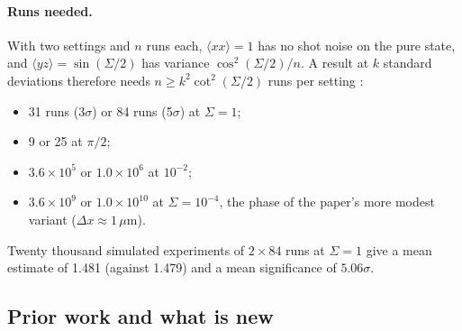 \paragraph{Runs needed.} With two settings and $n$ runs each, $\langle xx\rangle=1$ has no shot noise on the pure state, and
$\langle yz\rangle=\sin(\Sigma/2)$ has variance $\cos^2(\Sigma/2)/n$. A result at $k$ standard deviations therefore needs
$n\ge k^2\cot^2(\Sigma/2)$ runs per setting :
\begin{itemize}[nosep]
\item 31 runs (3$\sigma$) or 84 runs (5$\sigma$) at $\Sigma=1$;
\item 9 or 25 at $\pi/2$;
\item $3.6\times10^5$ or $1.0\times10^6$ at $10^{-2}$;
\item $3.6\times10^9$ or $1.0\times10^{10}$ at $\Sigma=10^{-4}$, the phase of the paper's more modest variant ($\Delta x\approx1\,\mu$m).
\end{itemize}
Twenty thousand simulated experiments of $2\times84$ runs at $\Sigma=1$ give a mean estimate of 1.481 (against 1.479) and a mean significance
of $5.06\sigma$.

\subsection{Prior work and what is new}\label{ss:bmv-prior}

